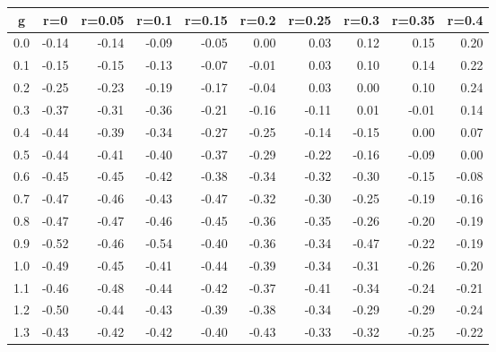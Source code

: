 %
\begin{table}[!tbp]
 \begin{center}
 \begin{tabular}{rrrrrrrrrr}\hline\hline
\multicolumn{1}{c}{g}&\multicolumn{1}{c}{r=0}&\multicolumn{1}{c}{r=0.05}&\multicolumn{1}{c}{r=0.1}&\multicolumn{1}{c}{r=0.15}&\multicolumn{1}{c}{r=0.2}&\multicolumn{1}{c}{r=0.25}&\multicolumn{1}{c}{r=0.3}&\multicolumn{1}{c}{r=0.35}&\multicolumn{1}{c}{r=0.4}\tabularnewline
\hline
0.0&-0.14&-0.14&-0.09&-0.05& 0.00& 0.03& 0.12& 0.15& 0.20\tabularnewline
0.1&-0.15&-0.15&-0.13&-0.07&-0.01& 0.03& 0.10& 0.14& 0.22\tabularnewline
0.2&-0.25&-0.23&-0.19&-0.17&-0.04& 0.03& 0.00& 0.10& 0.24\tabularnewline
0.3&-0.37&-0.31&-0.36&-0.21&-0.16&-0.11& 0.01&-0.01& 0.14\tabularnewline
0.4&-0.44&-0.39&-0.34&-0.27&-0.25&-0.14&-0.15& 0.00& 0.07\tabularnewline
0.5&-0.44&-0.41&-0.40&-0.37&-0.29&-0.22&-0.16&-0.09& 0.00\tabularnewline
0.6&-0.45&-0.45&-0.42&-0.38&-0.34&-0.32&-0.30&-0.15&-0.08\tabularnewline
0.7&-0.47&-0.46&-0.43&-0.47&-0.32&-0.30&-0.25&-0.19&-0.16\tabularnewline
0.8&-0.47&-0.47&-0.46&-0.45&-0.36&-0.35&-0.26&-0.20&-0.19\tabularnewline
0.9&-0.52&-0.46&-0.54&-0.40&-0.36&-0.34&-0.47&-0.22&-0.19\tabularnewline
1.0&-0.49&-0.45&-0.41&-0.44&-0.39&-0.34&-0.31&-0.26&-0.20\tabularnewline
1.1&-0.46&-0.48&-0.44&-0.42&-0.37&-0.41&-0.34&-0.24&-0.21\tabularnewline
1.2&-0.50&-0.44&-0.43&-0.39&-0.38&-0.34&-0.29&-0.29&-0.24\tabularnewline
1.3&-0.43&-0.42&-0.42&-0.40&-0.43&-0.33&-0.32&-0.25&-0.22\tabularnewline
\hline
\end{tabular}

\end{center}

\end{table}

